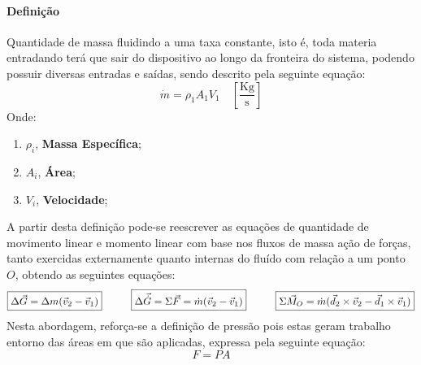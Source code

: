 \documentclass{article}
\begin{document}
            \paragraph{Definição}Quantidade de massa fluidindo a uma taxa constante, isto é, toda materia entradando terá que sair do dispositivo ao longo da fronteira do sistema, podendo possuir diversas entradas e saídas, sendo descrito pela seguinte equação:
                \begin{equation}
                    \boxed{
                        \dot{m} = \rho_{1} A_{1} V_{1}
                        \quad
                        \left[\frac{\text{Kg}}{\text{s}}\right]
                    }
                \end{equation}
            Onde:
                \begin{enumerate}[rightmargin =\leftmargin, noitemsep]
                    \item $\rho_{i}$, \textbf{Massa Específica};
                    \item $A_{i}$, \textbf{Área};
                    \item $V_{i}$, \textbf{Velocidade};
                \end{enumerate}
            A partir desta definição pode-se reescrever as equações de quantidade de movimento linear e momento linear com base nos fluxos de massa ação de forças, tanto exercidas externamente quanto internas do fluído com relação a um ponto $O$, obtendo as seguintes equações:
                \begin{equation}
                    \boxed{
                        \Delta\vec{G} = \Delta m (\vec{v}_{2} - \vec{v}_{1})
                    }
                    \hspace{10mm}
                    \boxed{
                        \Delta\vec{\dot{G}} = 
                        \Sigma \vec{F} = 
                        \dot{m} (\vec{v}_{2} - \vec{v}_{1})
                    }
                    \hspace{10mm}
                    \boxed{
                        \Sigma \vec{M}_{O} = \dot{m} (\vec{d}_{2}\times\vec{v}_{2} - \vec{d}_{1}\times\vec{v}_{1})
                    }
                \end{equation}
            Nesta abordagem, reforça-se a definição de pressão pois estas geram trabalho entorno das áreas em que são aplicadas, expressa pela seguinte equação:
                \begin{equation}
                    \boxed{
                        F = P A
                    }
                \end{equation}
\end{document}
